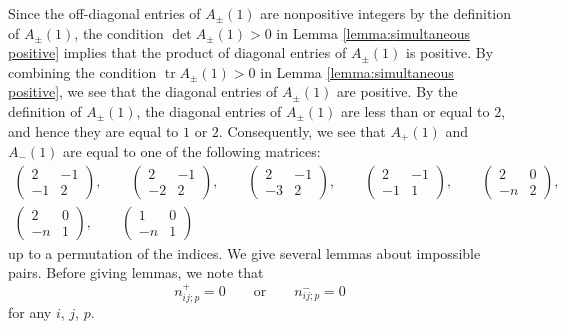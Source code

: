 \documentclass[pdftex]{sigma}
\numberwithin{equation}{section}
\theoremstyle{definition}
\DeclareMathOperator{\tr}{tr}
\begin{document}
Since the off-diagonal entries of $A_\pm(1)$ are nonpositive integers by
the definition of $A_\pm(1)$,
the condition $\det A_\pm(1) > 0$ in Lemma \ref{lemma:simultaneous positive} implies that
the product of diagonal entries of $A_\pm(1)$ is positive.
By combining the condition $\tr A_\pm(1) > 0$ in Lemma \ref{lemma:simultaneous positive},
we see that the diagonal entries of $A_\pm(1)$ are positive.
By the definition of $A_\pm(1)$, the diagonal entries of $A_\pm(1)$ are less than or equal to $2$,
and hence they are equal to $1$ or $2$.
Consequently, we see that $A_+(1)$ and~$A_-(1)$ are equal to one of the following matrices:
\begin{gather*}
 \begin{pmatrix}
 2 & -1 \\
 -1 & 2
 \end{pmatrix},\qquad
 \begin{pmatrix}
 2 & -1 \\
 -2 & 2
 \end{pmatrix},\qquad
 \begin{pmatrix}
 2 & -1 \\
 -3 & 2
 \end{pmatrix},\qquad
 \begin{pmatrix}
 2 & -1 \\
 -1 & 1
 \end{pmatrix},\qquad
 \begin{pmatrix}
 2 & 0 \\
 -n & 2
 \end{pmatrix},\\
 \begin{pmatrix}
 2 & 0 \\
 -n & 1
 \end{pmatrix},\qquad
 \begin{pmatrix}
 1 & 0 \\
 -n & 1
 \end{pmatrix}
\end{gather*}
up to a permutation of the indices.
We give several lemmas about impossible pairs.
Before giving lemmas, we note that
\begin{equation}\label{eq:Y2}
 n_{ij;p}^{+} = 0 \qquad \text{or} \qquad n_{ij;p}^{-}=0
\end{equation}
for any $i$, $j$, $p$.
\end{document}
